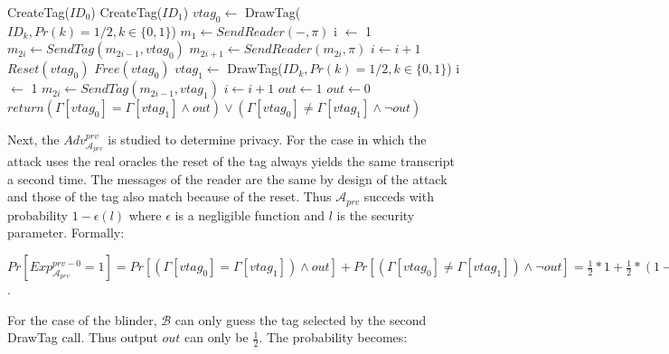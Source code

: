     \begin{algorithm}[H] %
        \centering
        \caption{$\mathcal{A}_{prv}$ against narrow-weak privacy}
        \begin{algorithmic}[1] %
            \State CreateTag($ID_0$)
            \State CreateTag($ID_1$)
            \State $vtag_{0} \leftarrow$ DrawTag($ID_k, Pr(k)= 1/2, k \in \{0,1\}$) 
            \State $m_1 \leftarrow SendReader(-,\pi)$ 
            \State i $\leftarrow$ 1
                \State $m_{2i} \gets SendTag(m_{2i-1}, vtag_{0})$
                \State $m_{2i+1} \gets SendReader(m_{2i}, \pi)$
                \State $i \gets i+1$
            \EndWhile
            \State $Reset(vtag_{0})$
            \State $Free(vtag_{0})$
            \State $vtag_{1} \leftarrow$ DrawTag($ID_k, Pr(k)= 1/2, k \in \{0,1\}$) 
            \State i $\leftarrow$ 1
                \State $m_{2i} \gets SendTag(m_{2i-1}, vtag_{1})$
                \State $i \gets i+1$
            \EndWhile       
                \State $out \leftarrow 1$
            \Else
                \State $out \leftarrow 0$
            \EndIf
            \State $return (\Gamma[vtag_{0}] = \Gamma[vtag_{1}] \land out) \lor 
                (\Gamma[vtag_{0}] \neq \Gamma[vtag_{1}] \land \lnot out)$
        \end{algorithmic}
    \end{algorithm}

    Next, the $Adv_{\mathcal{A}_{prv}}^{prv}$ is studied to determine privacy. For the case in which the attack uses the real oracles the reset of the tag always yields the same transcript a second time. 
    The messages of the reader are the same by design of the attack and those of the tag also match because of the reset. Thus $\mathcal{A}_{prv}$ succeds with probability $1-\epsilon(l)$
    where $\epsilon$ is a negligible function and $l$ is the security parameter. Formally:

    $Pr[Exp_{\mathcal{A}_{prv}}^{prv-0} = 1] = Pr[(\Gamma[vtag_{0}] = \Gamma[vtag_{1}]) \land out] + Pr[(\Gamma[vtag_{0}] \neq \Gamma[vtag_{1}]) \land \lnot out] = 
        \frac{1}{2}*1+\frac{1}{2}*(1-\epsilon(l)) = 1-epsilon(l)/2$.
    
    For the case of the blinder, $\mathcal{B}$ can only guess the tag selected by the second DrawTag call. Thus output $out$ can only be $\frac{1}{2}.$ The probability becomes:

